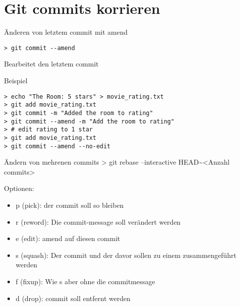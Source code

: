 \documentclass[presentation, smaller]{beamer}
\begin{document}
\section{Git commits korrieren}
\label{sec:org7b0ff0e}
\begin{frame}[fragile,label={sec:org48835f5}]{Änderen von letztem commit mit amend}
 \begin{verbatim}
> git commit --amend
\end{verbatim}
Bearbeitet den letztem commit
\end{frame}
\begin{frame}[fragile,label={sec:org9d722d7}]{Beispiel}
 \begin{verbatim}
> echo "The Room: 5 stars" > movie_rating.txt
> git add movie_rating.txt
> git commit -m "Added the room to rating"
> git commit --amend -m "Add the room to rating"
> # edit rating to 1 star
> git add movie_rating.txt
> git commit --amend --no-edit
\end{verbatim}
\end{frame}
\begin{frame}[label={sec:orga9be044}]{Ändern von mehrenen commits}
> git rebase --interactive HEAD\textasciitilde{}<Anzahl commits>
\begin{block}{Optionen:}
\begin{itemize}
\item p (pick): der commit soll so bleiben
\item r (reword): Die commit-message soll verändert werden
\item e (edit): amend auf diesen commit
\item s (squash): Der commit und der davor sollen zu einem zusammengeführt werden
\item f (fixup): Wie s aber ohne die commitmessage
\item d (drop): commit soll entfernt werden
\end{itemize}
\end{block}
\end{frame}
\end{document}
